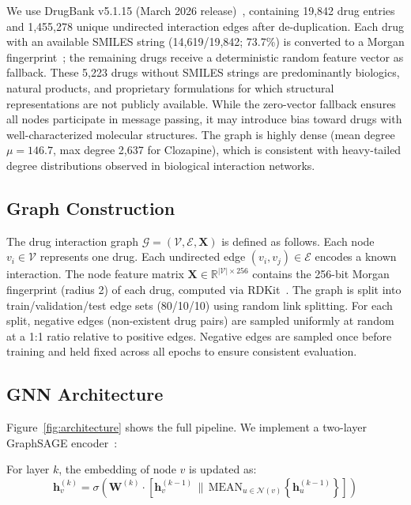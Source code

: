 \documentclass[10pt,twocolumn]{article}
\begin{document}
We use DrugBank v5.1.15 (March 2026 release)~\cite{wishart2018}, containing
19,842 drug entries and 1,455,278 unique undirected interaction edges after
de-duplication. Each drug with an available SMILES string (14,619/19,842; 73.7\%)
is converted to a Morgan fingerprint~\cite{rogers2010}; the remaining drugs receive
a deterministic random feature vector as fallback. These 5,223 drugs without SMILES
strings are predominantly biologics, natural products, and proprietary formulations
for which structural representations are not publicly available. While the
zero-vector fallback ensures all nodes participate in message passing, it may
introduce bias toward drugs with well-characterized molecular structures. The graph is highly dense
(mean degree $\mu = 146.7$, max degree 2,637 for Clozapine), which is consistent
with heavy-tailed degree distributions observed in biological interaction networks.

\subsection{Graph Construction}

The drug interaction graph $\mathcal{G} = (\mathcal{V}, \mathcal{E}, \mathbf{X})$
is defined as follows. Each node $v_i \in \mathcal{V}$ represents one drug.
Each undirected edge $(v_i, v_j) \in \mathcal{E}$ encodes a known interaction.
The node feature matrix $\mathbf{X} \in \mathbb{R}^{|\mathcal{V}| \times 256}$
contains the 256-bit Morgan fingerprint (radius 2) of each drug, computed via
RDKit~\cite{landrum2006}. The graph is split into train/validation/test edge sets
(80/10/10) using random link splitting. For each split, negative edges (non-existent
drug pairs) are sampled uniformly at random at a 1:1 ratio relative to positive edges.
Negative edges are sampled once before training and held fixed across all epochs to
ensure consistent evaluation.

\subsection{GNN Architecture}

Figure~\ref{fig:architecture} shows the full pipeline. We implement a two-layer
GraphSAGE encoder~\cite{hamilton2017}:

\vspace{2pt}
\noindent For layer $k$, the embedding of node $v$ is updated as:
\begin{equation}
  \mathbf{h}_v^{(k)} = \sigma\!\left(\mathbf{W}^{(k)}\!\cdot\!\left[
    \mathbf{h}_v^{(k-1)} \,\|\,
    \mathrm{MEAN}_{u \in \mathcal{N}(v)}\!\left\{\mathbf{h}_u^{(k-1)}\right\}
  \right]\right)
  \label{eq:sage}
\end{equation}
\end{document}
